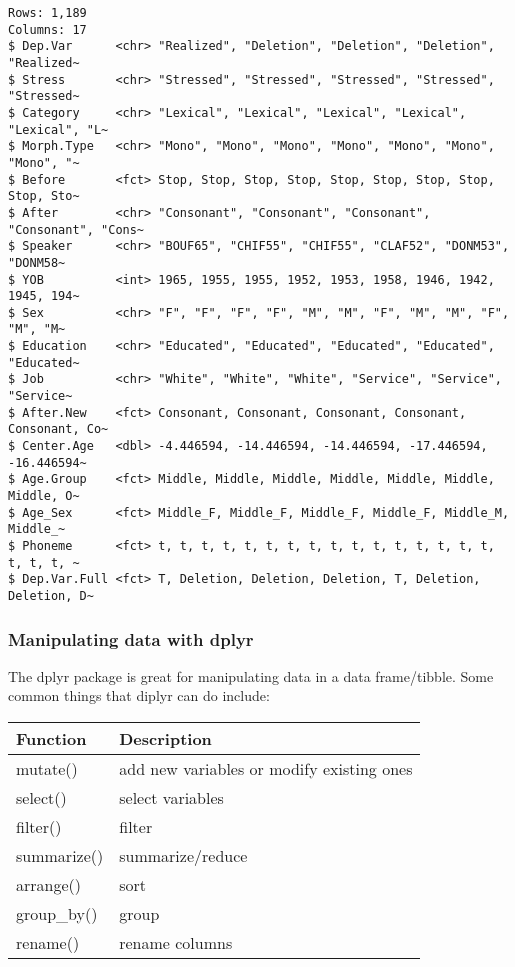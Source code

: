 \documentclass[
  12pt,
  letterpaper]{article}
\renewcommand\texttt[1]{{\ttfamily\color{BrickRed}#1}}
\begin{document}
\begin{verbatim}
Rows: 1,189
Columns: 17
$ Dep.Var      <chr> "Realized", "Deletion", "Deletion", "Deletion", "Realized~
$ Stress       <chr> "Stressed", "Stressed", "Stressed", "Stressed", "Stressed~
$ Category     <chr> "Lexical", "Lexical", "Lexical", "Lexical", "Lexical", "L~
$ Morph.Type   <chr> "Mono", "Mono", "Mono", "Mono", "Mono", "Mono", "Mono", "~
$ Before       <fct> Stop, Stop, Stop, Stop, Stop, Stop, Stop, Stop, Stop, Sto~
$ After        <chr> "Consonant", "Consonant", "Consonant", "Consonant", "Cons~
$ Speaker      <chr> "BOUF65", "CHIF55", "CHIF55", "CLAF52", "DONM53", "DONM58~
$ YOB          <int> 1965, 1955, 1955, 1952, 1953, 1958, 1946, 1942, 1945, 194~
$ Sex          <chr> "F", "F", "F", "F", "M", "M", "F", "M", "M", "F", "M", "M~
$ Education    <chr> "Educated", "Educated", "Educated", "Educated", "Educated~
$ Job          <chr> "White", "White", "White", "Service", "Service", "Service~
$ After.New    <fct> Consonant, Consonant, Consonant, Consonant, Consonant, Co~
$ Center.Age   <dbl> -4.446594, -14.446594, -14.446594, -17.446594, -16.446594~
$ Age.Group    <fct> Middle, Middle, Middle, Middle, Middle, Middle, Middle, O~
$ Age_Sex      <fct> Middle_F, Middle_F, Middle_F, Middle_F, Middle_M, Middle_~
$ Phoneme      <fct> t, t, t, t, t, t, t, t, t, t, t, t, t, t, t, t, t, t, t, ~
$ Dep.Var.Full <fct> T, Deletion, Deletion, Deletion, T, Deletion, Deletion, D~
\end{verbatim}

\hypertarget{manipulating-data-with-dplyr}{%
\subsubsection{\texorpdfstring{Manipulating data with
\texttt{dplyr}}{Manipulating data with dplyr}}\label{manipulating-data-with-dplyr}}

The \texttt{dplyr} package is great for manipulating data in a data
frame/tibble. Some common things that \texttt{diplyr} can do include:

\begin{longtable}[]{@{}ll@{}}
\toprule()
Function & Description \\
\midrule()
\endhead
\texttt{mutate()} & add new variables or modify existing ones \\
\texttt{select()} & select variables \\
\texttt{filter()} & filter \\
\texttt{summarize()} & summarize/reduce \\
\texttt{arrange()} & sort \\
\texttt{group\_by()} & group \\
\texttt{rename()} & rename columns \\
\bottomrule()
\end{longtable}
\end{document}
